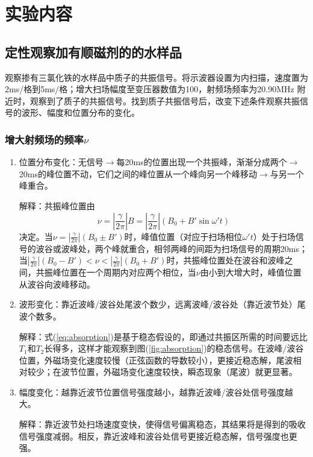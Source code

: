 \documentclass[aps,pre,12pt,preprint,onecolumn,showpacs,showkeys]{revtex4-1}
\begin{document}
\section{实验内容}
\subsection{定性观察加有顺磁剂的的水样品}\label{A}
观察掺有三氯化铁的水样品中质子的共振信号。将示波器设置为内扫描，速度置为2ms/格到5ms/格；增大扫场幅度至变压器数值为100，射频场频率为20.90MHz 附近时，观察到了质子的共振信号。找到质子共振信号后，改变下述条件观察共振信号的波形、幅度和位置分布的变化。
\subsubsection{增大射频场的频率$\nu$}\label{changefreq}
\begin{enumerate}
\item 位置分布变化：无信号$\to$每20ms的位置出现一个共振峰，渐渐分成两个$\to$20ms的峰位置不动，它们之间的峰位置从一个峰向另一个峰移动$\to$与另一个峰重合。

解释：共振峰位置由
\begin{equation}
\nu=|\frac{\gamma}{2\pi}|B=|\frac{\gamma}{2\pi}|(B_0+B'\sin \omega' t)\label{eq:reso}
\end{equation}
决定。当$\nu=|\frac{\gamma}{2\pi}|(B_0\pm B')$时，峰值位置（对应于扫场相位$\omega' t$）处于扫场信号的波谷或波峰处，两个峰就重合，相邻两峰的间距为扫场信号的周期20ms；当$|\frac{\gamma}{2\pi}|(B_0-B')<\nu<|\frac{\gamma}{2\pi}|(B_0+ B')$时，共振峰位置处在波谷和波峰之间，共振峰位置在一个周期内对应两个相位，当$\nu$由小到大增大时，峰值位置从波谷向波峰移动。

\item 波形变化：靠近波峰/波谷处尾波个数少，远离波峰/波谷处（靠近波节处）尾波个数多。

解释：式(\ref{eq:absorption})是基于稳态假设的，即通过共振区所需的时间要远比$T_1$和$T_2$长得多，这样才能观察到图(\ref{fig:absorption})的稳态信号。在波峰/波谷位置，外磁场变化速度较慢（正弦函数的导数较小），更接近稳态解，尾波相对较少；在波节位置，外磁场变化速度较快，瞬态现象（尾波）就更显著。

\item 幅度变化：越靠近波节位置信号强度越小，越靠近波峰/波谷处信号强度越大。

解释：靠近波节处扫场速度变快，使得信号偏离稳态，其结果将是得到的吸收信号强度减弱。相反，靠近波峰和波谷处信号更接近稳态解，信号强度也更强。
\end{enumerate}
\end{document}

